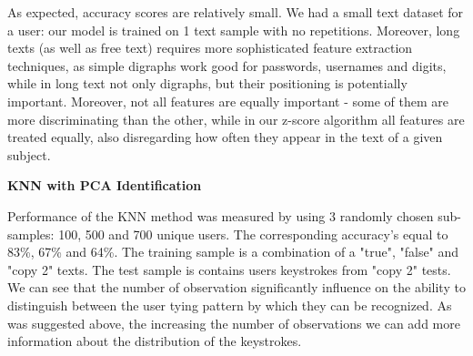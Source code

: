 \documentclass[12pt,a4]{article}
\begin{document}
As expected, accuracy scores are relatively small. We had a small text dataset for a user: our model is trained on 1 text sample with no repetitions. Moreover, long texts (as well as free text) requires more sophisticated feature extraction techniques, as simple digraphs work good for passwords, usernames and digits, while in long text not only digraphs, but their positioning is potentially important. Moreover, not all features are equally important - some of them are more discriminating than the other, while in our z-score algorithm all features are treated equally, also disregarding how often they appear in the text of a given subject.


\medskip
\small\textbf{KNN with PCA Identification}
\medskip

\normalsize

Performance of the KNN method was measured by using 3 randomly chosen sub-samples: 100, 500 and 700 unique users. The corresponding accuracy's equal to 83\%, 67\% and 64\%. The training sample is a combination of a "true", "false" and "copy 2" texts. The test sample is contains users keystrokes from "copy 2" tests. We can see that the number of observation significantly influence on the ability to distinguish between the user tying pattern by which they can be recognized. As was suggested above, the increasing the number of observations we can add more information about the distribution of the keystrokes. 

{}

\end{document}

